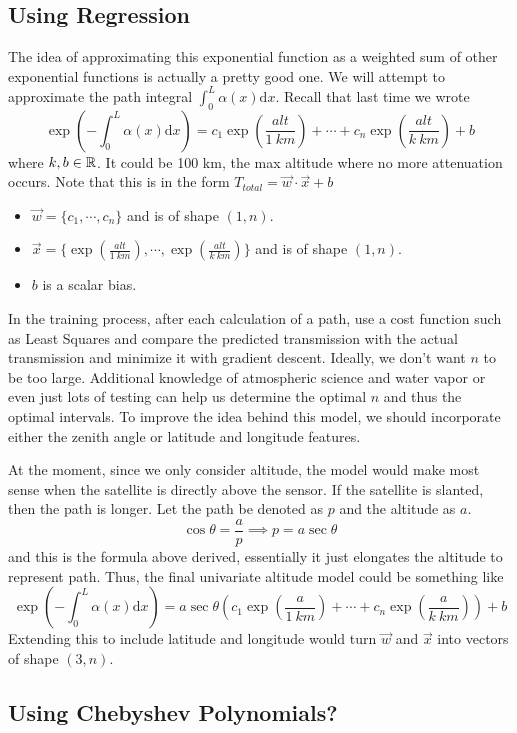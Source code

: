 \documentclass[12pt]{scrartcl}
\begin{document}
\subsection{Using Regression}

The idea of approximating this exponential function as a weighted sum of other exponential functions is actually a pretty good one. We will attempt to approximate the path integral $\int_0^L \alpha(x) \text{d}x$. Recall that last time we wrote
\[\exp (-\int_0^L \alpha(x) \text{d}x) = c_1\exp(\frac{alt}{1 \ km}) + \cdots + c_n\exp(\frac{alt}{k \ km}) + b\]
where $k, b\in \mathbb R$. It could be 100 km, the max altitude where no more attenuation occurs. Note that this is in the form
$T_{total} = \vec{w} \cdot \vec{x} + b$
\begin{itemize}
    \item $\vec{w} = \{c_1, \cdots, c_n\}$ and is of shape $(1,n)$.
    \item $\vec{x} = \{\exp(\frac{alt}{1 \ km}), \cdots, \exp(\frac{alt}{k \ km})\}$ and is of shape $(1,n)$.
    \item $b$ is a scalar bias.
\end{itemize}
In the training process, after each calculation of a path, use a cost function such as Least Squares and compare the predicted transmission with the actual transmission and minimize it with gradient descent. Ideally, we don't want $n$ to be too large. Additional knowledge of atmospheric science and water vapor or even just lots of testing can help us determine the optimal $n$ and thus the optimal intervals. To improve the idea behind this model, we should incorporate either the zenith angle or latitude and longitude features.

At the moment, since we only consider altitude, the model would make most sense when the satellite is directly above the sensor. If the satellite is slanted, then the path is longer. Let the path be denoted as $p$ and the altitude as $a$.
\[\cos\theta = \frac{a}{p} \implies p = a\sec\theta\]
and this is the formula above derived, essentially it just elongates the altitude to represent path. 
Thus, the final univariate altitude model could be something like
\[\exp (-\int_0^L \alpha(x) \text{d}x) = a \sec\theta (c_1\exp(\frac{a}{1 \ km}) + \cdots + c_n\exp(\frac{a}{k \ km})) + b\]
Extending this to include latitude and longitude would turn $\vec{w}$ and $\vec{x}$ into vectors of shape $(3, n)$.

\subsection{Using Chebyshev Polynomials?}
\end{document}
